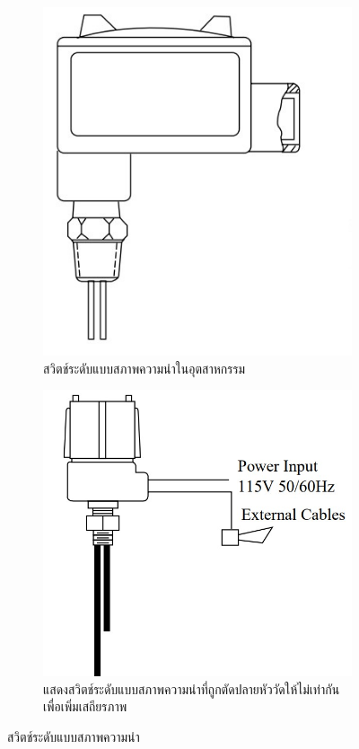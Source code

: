 \documentclass[final,11pt,a4paper]{article}
\begin{document}
\begin{figure}
    \begin{subfigure}[b]{0.3\textwidth}
        \centering
        \includegraphics[width=\textwidth]{images/Screenshot_8.jpg}
        \caption{สวิตช์ระดับแบบสภาพความนำในอุตสาหกรรม}
        \label{fig:cls1}
    \end{subfigure}
    \hfill
    \begin{subfigure}[b]{0.3\textwidth}
        \centering
        \includegraphics[width=\textwidth]{images/Screenshot_9.jpg}
        \caption{แสดงสวิตช์ระดับแบบสภาพความนำที่ถูกตัดปลายหัววัดให้ไม่เท่ากันเพื่อเพิ่มเสถียรภาพ}
        \label{fig:cls2}
    \end{subfigure}
    \hfill
    \caption{สวิตช์ระดับแบบสภาพความนำ}
    \label{fig:cls}
\end{figure}
\end{document}
